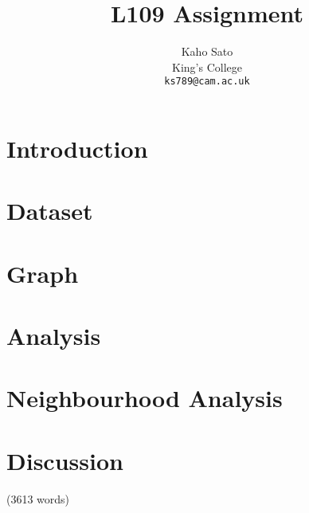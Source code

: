 \documentclass[11pt]{article}
\title{L109 Assignment}
\author{Kaho Sato \\
King's College \\
  {\tt ks789@cam.ac.uk}}
\date{}
\begin{document}
\maketitle

\section{Introduction}
\label{sec:introduction}


\section{Dataset}
\label{sec:dataset}


\section{Graph}
\label{sec:graph}


\section{Analysis}
\label{sec:analysis}


\section{Neighbourhood Analysis}
\label{sec:community}


\section{Discussion}
\label{sec:discussion}

(3613 words)

\nocite{*}

\end{document}

